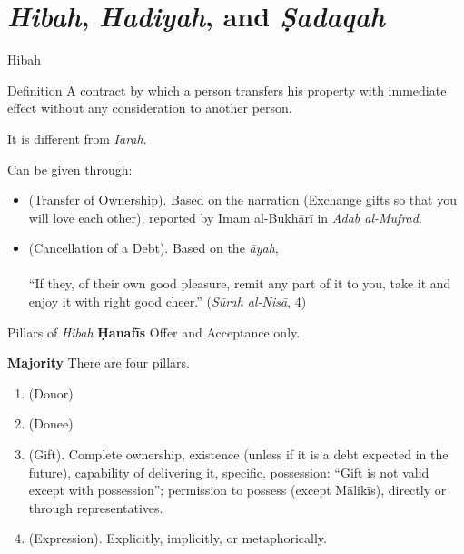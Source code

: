\section{\textit{Hibah}, \textit{Hadiyah}, and \textit{Ṣadaqah}}\label{hibah-hadiyah-and-ux1e63adaqah}

\begin{frame}{Hibah \hfill {}}

\begin{block}{Definition}
A contract by which a person transfers his property with immediate effect without any consideration to another person.
\end{block}
It is different from \textit{Iarah}.

Can be given through:
\begin{itemize}
\item {} (Transfer of Ownership). Based on the narration {} (Exchange gifts so that you will love each other), reported by Imam al-Bukhārī in \textit{Adab al-Mufrad}.
\item {} (Cancellation of a Debt). Based on the \textit{āyah},\\{}\\
“If they, of their own good pleasure, remit any part of it to you, take it and enjoy it with right good cheer.” (\textit{Sūrah al-Nisā}, 4)
\end{itemize}
\end{frame}

\begin{frame}{Pillars of \textit{Hibah} \hfill {}}
\textbf{Ḥanafīs} Offer and Acceptance only.

\textbf{Majority} There are four pillars.

\begin{enumerate}
  \item {} (Donor)
  \item {} (Donee)
  \item {} (Gift). Complete ownership, existence (unless if it is a debt expected in the future), capability of delivering it, specific, possession: “Gift is not valid except with possession”; permission to possess (except Mālikīs), directly or through representatives.
  \item {} (Expression). Explicitly, implicitly, or metaphorically.
\end{enumerate}
\end{frame}

